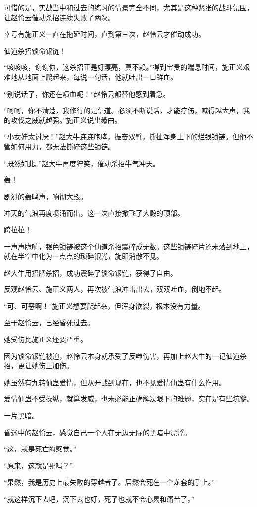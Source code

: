 \begin{this_body}
可惜的是，实战当中和过去的练习的情景完全不同，尤其是这种紧张的战斗氛围，让赵怜云催动杀招连续失败了两次。

幸亏有施正义一直在拖延时间，直到第三次，赵怜云才催动成功。

仙道杀招锁命银链！

“咳咳咳，谢谢你，这杀招正是好漂亮，真不赖。”得到宝贵的喘息时间，施正义艰难地从地面上爬起来，每说一句话，他就吐出一口鲜血。

“别说话了，你还在喷血呢！”赵怜云都替他感到着急。

“呵呵，你不清楚，我修行的是信道。必须不断说话，才能疗伤。喊得越大声，我的攻伐之威就越强。”施正义说出缘由。

“小女娃太讨厌！”赵大牛连连咆哮，振奋双臂，撕扯浑身上下的烂银锁链。但他不管如何用力，都无法撕碎这些锁链。

“既然如此。”赵大牛再度狞笑，催动杀招牛气冲天。

轰！

剧烈的轰鸣声，响彻大殿。

冲天的气浪再度喷涌而出，这一次直接掀飞了大殿的顶部。

跨拉拉！

一声声脆响，银色锁链被这个仙道杀招震碎成无数。这些锁链碎片还未落到地上，就在半空中化为一点点的琐碎银光，旋即消散不见。

赵大牛用招牌杀招，成功震碎了锁命银链，获得了自由。

反观赵怜云、施正义两人，再次被气浪冲击出去，双双吐血，倒地不起。

“可、可恶啊！”施正义想要爬起来，但浑身欲裂，根本没有力量。

至于赵怜云，已经昏死过去。

她受伤比施正义还要严重。

因为锁命银链被迫，赵怜云本身就承受了反噬伤害，再加上赵大牛的一记仙道杀招，更让她伤上加伤。

她虽然有九转仙蛊爱情，但从开战到现在，也不见爱情仙蛊有什么作用。

爱情仙蛊不受操纵，就算发威，也未必能正确解决眼下的难题，实在是有些坑爹。

一片黑暗。

昏迷中的赵怜云，感觉自己一个人在无边无际的黑暗中漂浮。

“这，就是死亡的感觉。”

“原来，这就是死吗？”

“果然，我是历史上最失败的穿越者了。居然会死在一个龙套的手上。”

“就这样沉下去吧，沉下去也好，死了也就不会心累和痛苦了。”

\end{this_body}

